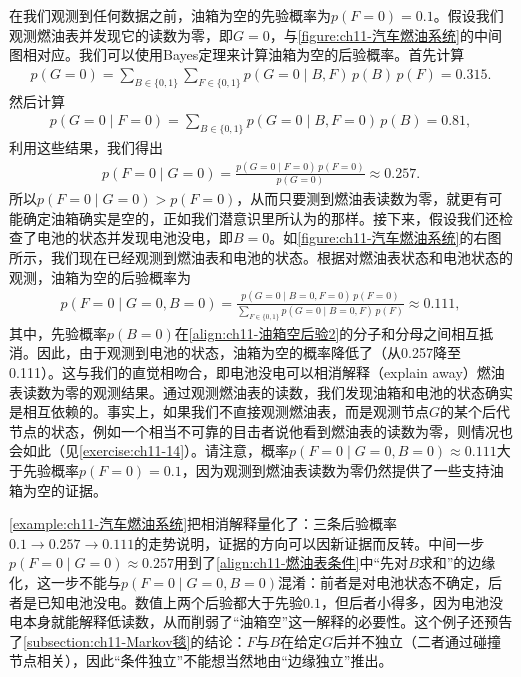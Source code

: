 \documentclass[../../main.tex]{subfiles}
\begin{document}
\begin{example}[ 汽车燃油系统]
在我们观测到任何数据之前，油箱为空的先验概率为$p(F=0)=0.1$。假设我们观测燃油表并发现它的读数为零，即$G=0$，与\cref{figure:ch11-汽车燃油系统}的中间图相对应。我们可以使用Bayes定理来计算油箱为空的后验概率。首先计算
\begin{align}
  p(G=0) = \sum_{B\in\{0,1\}}\sum_{F\in\{0,1\}}p(G=0\mid B,F)\,p(B)\,p(F) = 0.315.
  \label{align:ch11-燃油表边缘}
\end{align}
然后计算
\begin{align}
  p(G=0\mid F=0) = \sum_{B\in\{0,1\}}p(G=0\mid B,F=0)\,p(B) = 0.81,
  \label{align:ch11-燃油表条件}
\end{align}
利用这些结果，我们得出
\begin{align}
  p(F=0\mid G=0) = \frac{p(G=0\mid F=0)\,p(F=0)}{p(G=0)} \approx 0.257.
  \label{align:ch11-油箱空后验1}
\end{align}
所以$p(F=0\mid G=0)>p(F=0)$，从而只要测到燃油表读数为零，就更有可能确定油箱确实是空的，正如我们潜意识里所认为的那样。接下来，假设我们还检查了电池的状态并发现电池没电，即$B=0$。如\cref{figure:ch11-汽车燃油系统}的右图所示，我们现在已经观测到燃油表和电池的状态。根据对燃油表状态和电池状态的观测，油箱为空的后验概率为
\begin{align}
  p(F=0\mid G=0,B=0) = \frac{p(G=0\mid B=0,F=0)\,p(F=0)}{\sum_{F\in\{0,1\}}p(G=0\mid B=0,F)\,p(F)} \approx 0.111,
  \label{align:ch11-油箱空后验2}
\end{align}
其中，先验概率$p(B=0)$在\eqref{align:ch11-油箱空后验2}的分子和分母之间相互抵消。因此，由于观测到电池的状态，油箱为空的概率降低了（从0.257降至0.111）。这与我们的直觉相吻合，即电池没电可以相消解释（explain away）燃油表读数为零的观测结果。通过观测燃油表的读数，我们发现油箱和电池的状态确实是相互依赖的。事实上，如果我们不直接观测燃油表，而是观测节点$G$的某个后代节点的状态，例如一个相当不可靠的目击者说他看到燃油表的读数为零，则情况也会如此（见\cref{exercise:ch11-14}）。请注意，概率$p(F=0\mid G=0,B=0)\approx 0.111$大于先验概率$p(F=0)=0.1$，因为观测到燃油表读数为零仍然提供了一些支持油箱为空的证据。
\end{example}

\begin{remark}
\cref{example:ch11-汽车燃油系统}把相消解释量化了：三条后验概率$0.1\to0.257\to0.111$的走势说明，证据的方向可以因新证据而反转。中间一步$p(F=0\mid G=0)\approx0.257$用到了\eqref{align:ch11-燃油表条件}中“先对$B$求和”的边缘化，这一步不能与$p(F=0\mid G=0,B=0)$混淆：前者是对电池状态不确定，后者是已知电池没电。数值上两个后验都大于先验$0.1$，但后者小得多，因为电池没电本身就能解释低读数，从而削弱了“油箱空”这一解释的必要性。这个例子还预告了\cref{subsection:ch11-Markov毯}的结论：$F$与$B$在给定$G$后并不独立（二者通过碰撞节点相关），因此“条件独立”不能想当然地由“边缘独立”推出。
\end{remark}
\end{document}
